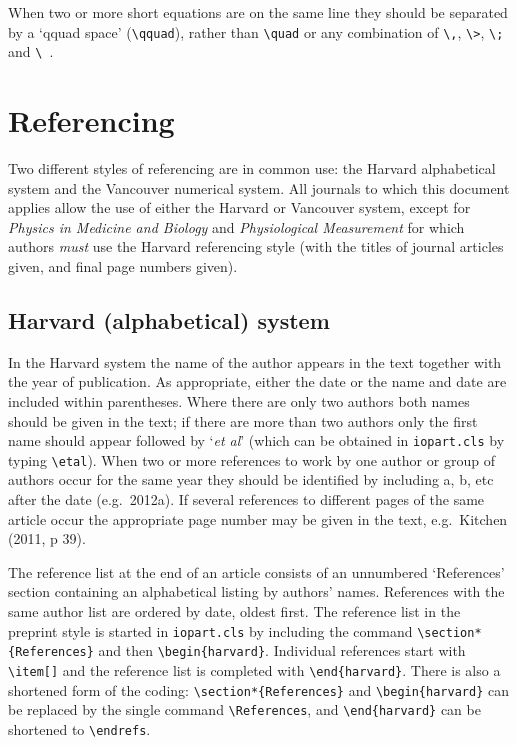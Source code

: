 \documentclass[12pt]{iopart}
\begin{document}
When two or more short equations are on the same line they should be 
separated by a `qquad space' (\verb"\qquad"), rather than
\verb"\quad" or any combination of \verb"\,", \verb"\>", \verb"\;" 
and \verb"\ ".

\section{Referencing\label{except}}
Two different styles of referencing are in common use: 
the Harvard alphabetical system and the Vancouver numerical system. 
All journals to which this document applies allow the use of either the Harvard or Vancouver system, 
except for {\it Physics in Medicine and Biology} and {\it Physiological Measurement}
for which authors {\it must\/} use the Harvard referencing style (with the titles of journal
articles given, and final page numbers given). 

\subsection{Harvard (alphabetical) system}
In the Harvard system the name of the author appears in the text together 
with the year of publication. As appropriate, either the date or the name 
and date are included within parentheses. Where there are only two authors 
both names should be given in the text; if there are more than two 
authors only the first name should appear followed by `{\it et al}' 
(which can be obtained in \verb"iopart.cls" by typing \verb"\etal"). When two or 
more references to work by one author or group of authors occur for the 
same year they should be identified by including a, b, etc after the date 
(e.g.\ 2012a). If several references to different pages of the same article 
occur the appropriate page number may be given in the text, e.g.\ Kitchen 
(2011, p 39).

The reference list at the end of an article consists of an 
unnumbered `References' section containing an
alphabetical listing by authors' names. References with the same author list are ordered by date, oldest first.
The reference list in the 
preprint style is started in \verb"iopart.cls" by including the command \verb"\section*{References}" and then
\verb"\begin{harvard}".
Individual references start with \verb"\item[]" and the reference list is completed with \verb"\end{harvard}".
There is also a shortened form of the coding: \verb"\section*{References}"
and \verb"\begin{harvard}" can be replaced by the single command
\verb"\References", and \verb"\end{harvard}" can be shortened to
\verb"\endrefs".
\end{document}
